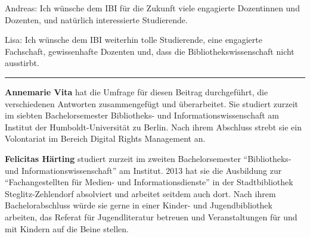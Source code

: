 \documentclass[a4paper,
fontsize=11pt,
oneside,
numbers=noperiodatend,
parskip=half-,
bibliography=totoc,
final
]{scrartcl}
\begin{document}
Andreas: Ich wünsche dem IBI für die Zukunft viele engagierte
Dozentinnen und Dozenten, und natürlich interessierte Studierende.

Lisa: Ich wünsche dem IBI weiterhin tolle Studierende, eine engagierte
Fachschaft, gewissenhafte Dozenten und, dass die Bibliothekswissenschaft
nicht ausstirbt.

\begin{center}\rule{0.5\linewidth}{\linethickness}\end{center}

\textbf{Annemarie Vita} hat die Umfrage für diesen Beitrag durchgeführt,
die verschiedenen Antworten zusammengefügt und überarbeitet. Sie
studiert zurzeit im siebten Bachelorsemester Bibliotheks- und
Informationswissenschaft am Institut der Humboldt-Universität zu Berlin.
Nach ihrem Abschluss strebt sie ein Volontariat im Bereich Digital
Rights Management an.

\textbf{Felicitas Härting} studiert zurzeit im zweiten Bachelorsemester
\enquote{Bibliotheks- und Informationswissenschaft} am Institut. 2013 hat sie
die Ausbildung zur \enquote{Fachangestellten für Medien- und
Informationsdienste} in der Stadtbibliothek Steglitz-Zehlendorf
absolviert und arbeitet seitdem auch dort. Nach ihrem Bachelorabschluss
würde sie gerne in einer Kinder- und Jugendbibliothek arbeiten, das
Referat für Jugendliteratur betreuen und Veranstaltungen für und mit
Kindern auf die Beine stellen.
\end{document}

